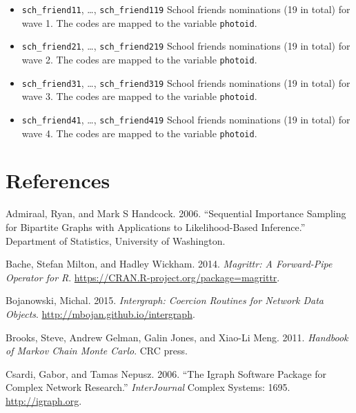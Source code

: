\documentclass[]{book}
\begin{document}
\begin{itemize}
\item
  \texttt{sch\_friend11}, \ldots{}, \texttt{sch\_friend119} School friends nominations (19 in total)
  for wave 1. The codes are mapped to the variable \texttt{photoid}.
\item
  \texttt{sch\_friend21}, \ldots{}, \texttt{sch\_friend219} School friends nominations (19 in total)
  for wave 2. The codes are mapped to the variable \texttt{photoid}.
\item
  \texttt{sch\_friend31}, \ldots{}, \texttt{sch\_friend319} School friends nominations (19 in total)
  for wave 3. The codes are mapped to the variable \texttt{photoid}.
\item
  \texttt{sch\_friend41}, \ldots{}, \texttt{sch\_friend419} School friends nominations (19 in total)
  for wave 4. The codes are mapped to the variable \texttt{photoid}.
\end{itemize}



\hypertarget{references}{%
\chapter*{References}\label{references}}

\hypertarget{refs}{}
\leavevmode\hypertarget{ref-admiraal2006}{}%
Admiraal, Ryan, and Mark S Handcock. 2006. ``Sequential Importance Sampling for Bipartite Graphs with Applications to Likelihood-Based Inference.'' Department of Statistics, University of Washington.

\leavevmode\hypertarget{ref-R-magrittr}{}%
Bache, Stefan Milton, and Hadley Wickham. 2014. \emph{Magrittr: A Forward-Pipe Operator for R}. \url{https://CRAN.R-project.org/package=magrittr}.

\leavevmode\hypertarget{ref-R-intergraph}{}%
Bojanowski, Michal. 2015. \emph{Intergraph: Coercion Routines for Network Data Objects}. \url{http://mbojan.github.io/intergraph}.

\leavevmode\hypertarget{ref-brooks2011}{}%
Brooks, Steve, Andrew Gelman, Galin Jones, and Xiao-Li Meng. 2011. \emph{Handbook of Markov Chain Monte Carlo}. CRC press.

\leavevmode\hypertarget{ref-R-igraph}{}%
Csardi, Gabor, and Tamas Nepusz. 2006. ``The Igraph Software Package for Complex Network Research.'' \emph{InterJournal} Complex Systems: 1695. \url{http://igraph.org}.
\end{document}
